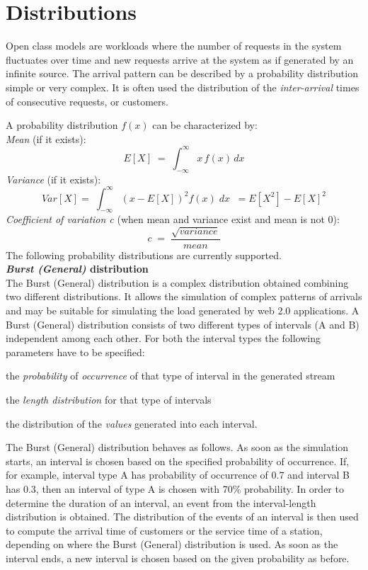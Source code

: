 \section{Distributions}
\label{distns}
Open class models are workloads where the number of
requests in the system fluctuates over time and new  requests
arrive at the system as if generated by an infinite source. The
arrival pattern can be described by a probability distribution
simple or very complex. It is often used the distribution of the
\emph{inter-arrival} times of consecutive requests, or customers.

A probability distribution $f(x)$ can be characterized by:\\
\emph{Mean} (if it exists):
\[
E[X]\; =\;\int_{-\infty}^{\infty} x\, f(x)\,dx
\]
\emph{Variance} (if it exists):
\[
Var[X] = \; \int_{-\infty}^{\infty} (x-E[X])^2 f(x)\; dx \;\; =
E[X^2] - E[X]^2
\]
\emph{Coefficient of variation c} (when mean and variance exist
and mean is not 0):
\[
c\; = \; \frac{\sqrt{variance}}{mean}
\]
The following probability distributions are currently supported.\\

\textbf{\emph{Burst (General)} distribution}\\
The Burst (General) distribution is a complex distribution
obtained combining two different distributions. It allows the
simulation of complex patterns of arrivals and may be suitable for
simulating the load generated by web 2.0 applications. A Burst
(General) distribution consists of two different types of
intervals (A and B) independent among each other. For both the
interval types the following parameters have to be specified:
\begin{itemize*}
\item the \emph{probability} of \emph{occurrence} of that type of
interval in the generated stream \item the \emph{length
distribution} for that type of intervals \item the distribution of
the \emph{values} generated into each interval.
\end{itemize*}
The Burst (General) distribution behaves as follows. As soon as
the simulation starts, an interval is chosen based on the
specified probability of occurrence. If, for example, interval
type A has probability of occurrence of 0.7 and interval B has
0.3, then an interval of type A is chosen with 70\% probability.
In order to determine the duration of an interval, an event from
the interval-length distribution is obtained. The distribution of
the events of an interval is then used to compute the arrival time
of customers or the service time of a station, depending on where
the Burst (General) distribution is used. As soon as the interval
ends, a new interval is chosen based on the given probability as
before.


